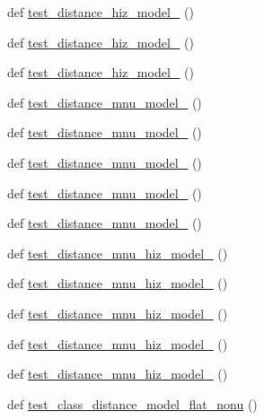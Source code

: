 \begin{DoxyCompactItemize}
\item 
def \mbox{\hyperlink{namespaceccl__test__distances_ad363cc38cdd3a8c2ef59161c5e163eb2}{test\+\_\+distance\+\_\+hiz\+\_\+model\+\_}} ()
\item 
def \mbox{\hyperlink{namespaceccl__test__distances_a55d3eaf66d13907ac22f589ed5c00919}{test\+\_\+distance\+\_\+hiz\+\_\+model\+\_}} ()
\item 
def \mbox{\hyperlink{namespaceccl__test__distances_aa07f859291800c156d3aba2ed8d0a49c}{test\+\_\+distance\+\_\+hiz\+\_\+model\+\_}} ()
\item 
def \mbox{\hyperlink{namespaceccl__test__distances_a2d83223c852c312a2098e9f9876e5e57}{test\+\_\+distance\+\_\+mnu\+\_\+model\+\_}} ()
\item 
def \mbox{\hyperlink{namespaceccl__test__distances_a96e0d6a13d048cf146a8a3bbbd79be84}{test\+\_\+distance\+\_\+mnu\+\_\+model\+\_}} ()
\item 
def \mbox{\hyperlink{namespaceccl__test__distances_a1b20f3421e9073c5a7f3bdbe34b799fa}{test\+\_\+distance\+\_\+mnu\+\_\+model\+\_}} ()
\item 
def \mbox{\hyperlink{namespaceccl__test__distances_a61ce1172f657410eec34707c121a9a19}{test\+\_\+distance\+\_\+mnu\+\_\+model\+\_}} ()
\item 
def \mbox{\hyperlink{namespaceccl__test__distances_aaa1d41cfec1083235cccae3beafe29a3}{test\+\_\+distance\+\_\+mnu\+\_\+model\+\_}} ()
\item 
def \mbox{\hyperlink{namespaceccl__test__distances_a811e73687fff88ef10c3491a1b6f68d8}{test\+\_\+distance\+\_\+mnu\+\_\+hiz\+\_\+model\+\_}} ()
\item 
def \mbox{\hyperlink{namespaceccl__test__distances_a5e35139a35d41e0c1c27dc99ebe6e075}{test\+\_\+distance\+\_\+mnu\+\_\+hiz\+\_\+model\+\_}} ()
\item 
def \mbox{\hyperlink{namespaceccl__test__distances_a3d7c4d84ee0ddeec416d6aa8bd01b5c3}{test\+\_\+distance\+\_\+mnu\+\_\+hiz\+\_\+model\+\_}} ()
\item 
def \mbox{\hyperlink{namespaceccl__test__distances_a853da8d0e0c3a2fe0c48452bf4f01cfb}{test\+\_\+distance\+\_\+mnu\+\_\+hiz\+\_\+model\+\_}} ()
\item 
def \mbox{\hyperlink{namespaceccl__test__distances_a2e163314e9fd86da308fcbaec4ed91eb}{test\+\_\+distance\+\_\+mnu\+\_\+hiz\+\_\+model\+\_}} ()
\item 
def \mbox{\hyperlink{namespaceccl__test__distances_abc58e784191f2c4f021f2a5f081a00d0}{test\+\_\+class\+\_\+distance\+\_\+model\+\_\+flat\+\_\+nonu}} ()

\end{DoxyCompactItemize}
